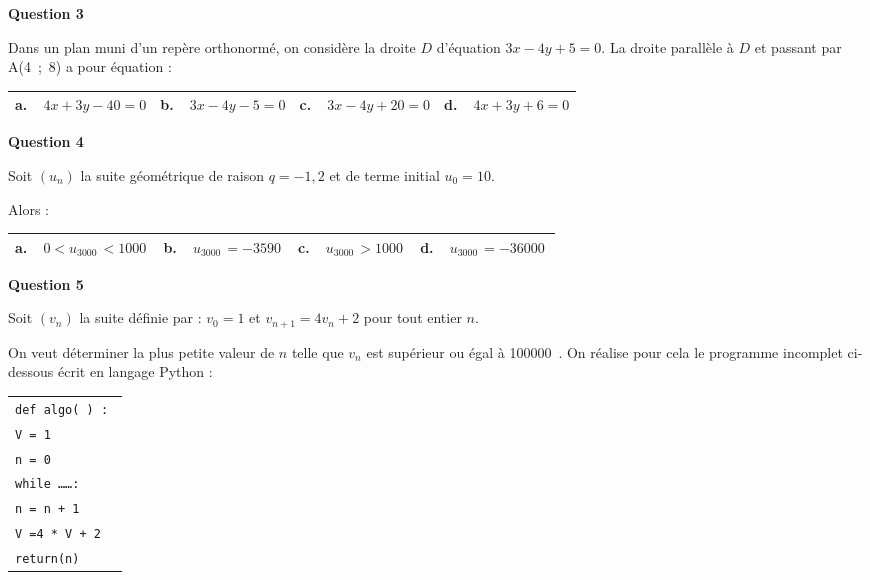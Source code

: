 \documentclass[10pt]{article}
\providecommand{\np}[2][]{{#2~#1}}
\begin{document}
\medskip

\textbf{Question 3}

\medskip

Dans un plan muni d'un repère orthonormé, on considère la droite $D$ d'équation
$3x - 4y + 5 = 0$. La droite parallèle à $D$ et passant par A(4~;~8) a pour équation :

\begin{center}
\begin{tabularx}{\linewidth}{|*{4}{X|}}\hline
\textbf{a.~~}$4x +3y - 40 = 0$ &\textbf{b.~~}$3x - 4y - 5 = 0$&\textbf{c.~~}$3x - 4y +20 = 0$&\textbf{d.~~}$4x +3y +6 = 0$\\ \hline
\end{tabularx}
\end{center}

\medskip

\textbf{Question 4}

\medskip

Soit $\left(u_n\right)$ la suite géométrique de raison $q = - 1,2$ et de terme initial $u_0 = 10$. 

Alors :

\begin{center}
\begin{tabularx}{\linewidth}{|*{4}{X|}}\hline
\textbf{a.~~}$0< u_{\np{3000}} < \np{1000}$ &\textbf{b.~~}$u_{\np{3000}} = \np{- 3590}$&\textbf{c.~~}$u_{\np{3000}} > \np{1000}$&\textbf{d.~~}$u_{\np{3000}} = - \np{36000}$\\ \hline
\end{tabularx}
\end{center}

\medskip

\textbf{Question 5}

\medskip

Soit $\left(v_n\right)$ la suite définie par : $v_0 = 1$ et $v_{n+1} = 4v_n +2$ pour tout entier $n$.

On veut déterminer la plus petite valeur de $n$ telle que $v_n$ est supérieur ou égal
à \np{100000}. On réalise pour cela le programme incomplet ci-dessous écrit en langage
Python :

\begin{center}
\begin{tabular}{|l|}\hline
\texttt{def algo( ) : }\\
\qquad \texttt{V = 1}\\
\qquad \texttt{n = 0}\\
\qquad \texttt{while \ldots \ldots :}\\
\qquad \qquad \texttt{n = n + 1}\\
\qquad \qquad \texttt{V =4 * V + 2}\\
\qquad  \texttt{return(n)}\\ \hline
\end{tabular}
\end{center}
\end{document}
